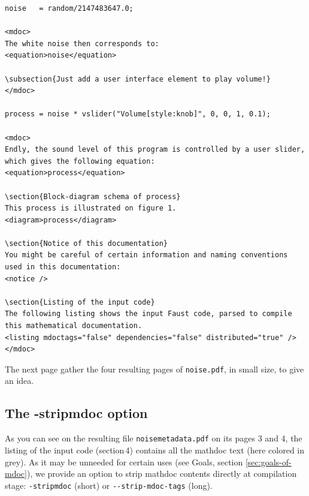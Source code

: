 \documentclass[a4paper,10pt]{book}
\begin{document}
\begin{lstlisting}
noise   = random/2147483647.0;

<mdoc>
The white noise then corresponds to:
<equation>noise</equation>

\subsection{Just add a user interface element to play volume!}
</mdoc>

process = noise * vslider("Volume[style:knob]", 0, 0, 1, 0.1);

<mdoc>
Endly, the sound level of this program is controlled by a user slider, which gives the following equation: 
<equation>process</equation>

\section{Block-diagram schema of process}
This process is illustrated on figure 1.
<diagram>process</diagram>

\section{Notice of this documentation}
You might be careful of certain information and naming conventions used in this documentation:
<notice />

\section{Listing of the input code}
The following listing shows the input Faust code, parsed to compile this mathematical documentation.
<listing mdoctags="false" dependencies="false" distributed="true" />
</mdoc>
\end{lstlisting}
\normalsize

The next page gather the four resulting pages of \lstinline!noise.pdf!, in small size, to give an idea.


\subsection{The -stripmdoc option}
\label{sec:striping-option}

As you can see on the resulting file \lstinline!noisemetadata.pdf! on its pages 3 and 4, the listing of the input code (section\,4) contains all the mathdoc text (here colored in grey). As it may be unneeded for certain uses (see Goals, section \ref{sec:goals-of-mdoc}), we provide an option to strip mathdoc contents directly at compilation stage: \lstinline!-stripmdoc! (short) or \lstinline!--strip-mdoc-tags! (long).
\end{document}

